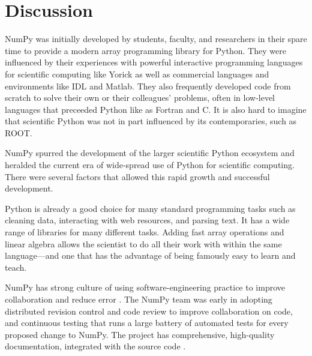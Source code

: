 \section*{Discussion}


NumPy was initially developed by students, faculty, and researchers in their spare time to provide a modern array programming library for Python.  They were influenced by their experiences with powerful interactive programming languages for scientific computing like Yorick \cite{munro1995using} as well as commercial languages and environments like IDL and Matlab.  They also frequently developed code from scratch to solve their own or their colleagues' problems, often in low-level languages that preceeded Python like as Fortran  and C.  It is also hard to imagine that scientific Python was not in part influenced by its contemporaries, such as ROOT.


NumPy spurred the development of the larger scientific Python ecosystem and
heralded the current era of wide-spread use of Python for scientific computing.
There were several factors that allowed this rapid growth and successful
development.

Python is already a good choice for many standard programming tasks such as
cleaning data, interacting with web resources, and parsing text.
It has a wide range of libraries for many different tasks.
Adding fast array operations and linear algebra allows the scientist to do all
their work with within the same language---and one that has the advantage of
being famously easy to learn and teach.

NumPy has strong culture of using software-engineering practice to
improve collaboration and reduce error \cite{millman2014developing}.
The NumPy team was early in adopting distributed revision control and code
review to improve collaboration on code, and continuous testing that runs a
large battery of automated tests for every proposed change to NumPy.
The project has comprehensive, high-quality documentation, integrated with the
source code \cite{vanderwalt2008scipy,harrington2008scipy,harrington2009scipy}.


